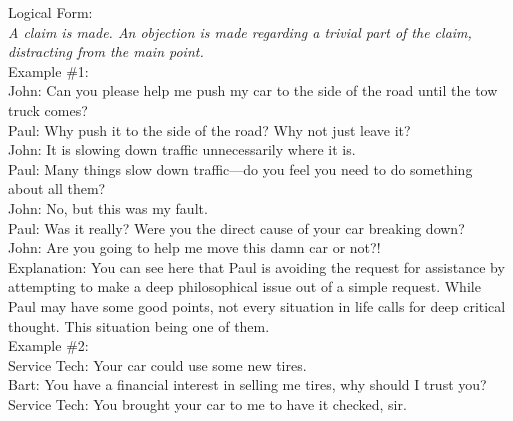 \documentclass[a4paper,12pt,single,pdftex]{scrbook}
\begin{document}
    
      Logical Form:{\it  \newline
}
    \\

    
      {\it A claim is made. \newline
An objection is made regarding a trivial part of the claim, distracting from the main point.}
    \\

    
      Example \#1:
    \\

    
      John: Can you please help me push my car to the side of the road until the tow truck comes?
    \\

    
      Paul: Why push it to the side of the road?  Why not just leave it?
    \\

    
      John: It is slowing down traffic unnecessarily where it is.
    \\

    
      Paul: Many things slow down traffic—do you feel you need to do something about all them?
    \\

    
      John: No, but this was my fault.
    \\

    
      Paul: Was it really? Were you the direct cause of your car breaking down?
    \\

    
      John: Are you going to help me move this damn car or not?!
    \\

    
      Explanation: You can see here that Paul is avoiding the request for assistance by attempting to make a deep philosophical issue out of a simple request.  While Paul may have some good points, not every situation in life calls for deep critical thought.  This situation being one of them.
    \\

    
      Example \#2:
    \\

    
      Service Tech: Your car could use some new tires.
    \\

    
      Bart: You have a financial interest in selling me tires, why should I trust you?
    \\

    
      Service Tech: You brought your car to me to have it checked, sir.
    \\
\end{document}

